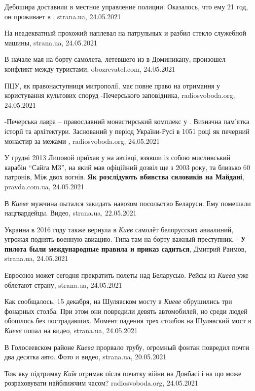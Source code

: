 Дебошира доставили в местное управление полиции. Оказалось, что ему 21 год, он
проживает в , strana.ua, 24.05.2021

На  неадекватный прохожий наплевал на патрульных и разбил
стекло служебной машины, strana.ua, 24.05.2021

В начале мая на борту самолета, летевшего из  в Доминикану,
произошел конфликт между туристами, obozrevatel.com, 24.05.2021

ПЦУ, як правонаступниця  митрополії, має повне право на отримання у
користування культових споруд -Печерського заповідника, radiosvoboda.org, 24.05.2021

-Печерська лавра – православний монастирський комплекс у . Визначна
пам'ятка історії та архітектури. Заснований у період України-Русі в 1051 році
як печерний монастир за межами , radiosvoboda.org, 24.05.2021

У грудні 2013 Липовой приїхав у  на автівці, взявши із собою
мисливський карабін \enquote{Сайга М3}, на який мав офіційний дозвіл ще з 2003
року, та близько 60 патронів, Між двох вогнів. \textbf{Як розслідують вбивства
силовиків на Майдані}, pravda.com.ua, 24.05.2021

В \emph{Киеве} мужчина пытался закидать навозом посольство Беларуси. Ему
помешали нацгвардейцы. Видео, strana.ua, 22.05.2021

Украина в 2016 году также вернула в \emph{Киев} самолёт белорусских авиалиний,
угрожая поднять военную авиацию. Типа там на борту важный преступник, -
\textbf{У пилота были международные правила и приказ садиться}, Дмитрий Раимов,
strana.ua, 24.05.2021

Евросоюз может сегодня прекратить полеты над Беларусью. Рейсы из \emph{Киева} уже
облетают страну, strana.ua, 24.05.2021

Как сообщалось, 15 декабря, на Шулявском мосту в \emph{Киеве} обрушились три фонарных
столба. При этом они повредили девять автомобилей, но среди людей обошлось без
пострадавших. Момент падения трех столбов на Шулявский мост в \emph{Киеве} попал на
видео, strana.ua, 24.05.2021

В Голосеевском районе \emph{Киева} прорвало трубу, огромный фонтан повредил
почти два десятка авто. Фото и видео, strana.ua, 20.05.2021

Тож яку підтримку \emph{Київ} отримав після початку війни на Донбасі і на що
може розраховувати найближчим часом? 
radiosvoboda.org, 24.05.2021

